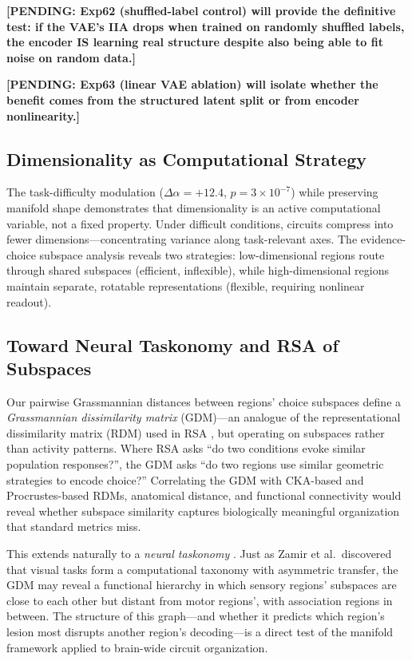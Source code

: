 \documentclass{article}
\newcommand{\pending}[1]{\textcolor{red!70!black}{\textbf{[PENDING: #1]}}}
\begin{document}
\pending{Exp62 (shuffled-label control) will provide the definitive test: if the VAE's IIA drops when trained on randomly shuffled labels, the encoder IS learning real structure despite also being able to fit noise on random data.}

\pending{Exp63 (linear VAE ablation) will isolate whether the benefit comes from the structured latent split or from encoder nonlinearity.}

\subsection{Dimensionality as Computational Strategy}

The task-difficulty modulation ($\Delta\alpha = +12.4$, $p = 3 \times 10^{-7}$) while preserving manifold shape demonstrates that dimensionality is an active computational variable, not a fixed property. Under difficult conditions, circuits compress into fewer dimensions---concentrating variance along task-relevant axes. The evidence-choice subspace analysis reveals two strategies: low-dimensional regions route through shared subspaces (efficient, inflexible), while high-dimensional regions maintain separate, rotatable representations (flexible, requiring nonlinear readout).

\subsection{Toward Neural Taskonomy and RSA of Subspaces}

Our pairwise Grassmannian distances between regions' choice subspaces define a \emph{Grassmannian dissimilarity matrix} (GDM)---an analogue of the representational dissimilarity matrix (RDM) used in RSA \citep{kriegeskorte2008representational}, but operating on subspaces rather than activity patterns. Where RSA asks ``do two conditions evoke similar population responses?'', the GDM asks ``do two regions use similar geometric strategies to encode choice?'' Correlating the GDM with CKA-based and Procrustes-based RDMs, anatomical distance, and functional connectivity would reveal whether subspace similarity captures biologically meaningful organization that standard metrics miss.

This extends naturally to a \emph{neural taskonomy} \citep{zamir2018taskonomy}. Just as Zamir et al.\ discovered that visual tasks form a computational taxonomy with asymmetric transfer, the GDM may reveal a functional hierarchy in which sensory regions' subspaces are close to each other but distant from motor regions', with association regions in between. The structure of this graph---and whether it predicts which region's lesion most disrupts another region's decoding---is a direct test of the manifold framework applied to brain-wide circuit organization.
\end{document}
